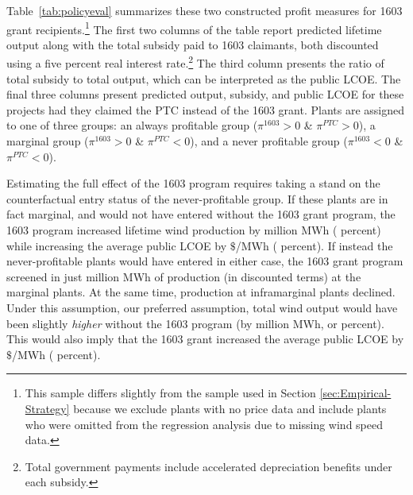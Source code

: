 \documentclass[12pt]{article}
\begin{document}
Table~\ref{tab:policyeval} summarizes these two constructed profit measures for 1603 grant recipients.\footnote{This sample differs slightly from the sample used in Section \ref{sec:Empirical-Strategy} because we exclude plants with no price data and include plants who were omitted from the regression analysis due to missing wind speed data.} The first two columns of the table report predicted lifetime output along with the total subsidy paid to 1603 claimants, both discounted using a five percent real interest rate.\footnote{Total government payments include accelerated depreciation benefits under each subsidy.} The third column presents the ratio of total subsidy to total output, which can be interpreted as the public LCOE. The final three columns present predicted output, subsidy, and public LCOE for these projects had they claimed the PTC instead of the 1603 grant. Plants are assigned to one of three groups: an always profitable group ($\pi^{1603}>0$ \& $\pi^{PTC}>0$), a marginal group ($\pi^{1603}>0$ \& $\pi^{PTC}<0$), and a never profitable group ($\pi^{1603}<0$ \& $\pi^{PTC}<0$).

Estimating the full effect of the 1603 program requires taking a stand on the counterfactual entry status of the never-profitable group. If these plants are in fact marginal, and would not have entered without the 1603 grant program, the 1603 program increased lifetime wind production by million MWh ( \unskip percent) while increasing the average public LCOE by $\$  $/MWh ( \unskip percent). If instead the never-profitable plants would have entered in either case, the 1603 grant program screened in just million MWh of production (in discounted terms) at the marginal plants. At the same time, production at inframarginal plants declined. Under this assumption, our preferred assumption, total wind output would have been slightly \emph{higher} without the 1603 program (by million MWh, or percent). This would also imply that the 1603 grant increased the average public LCOE by $\$  $/MWh ( \unskip percent).
\end{document}
